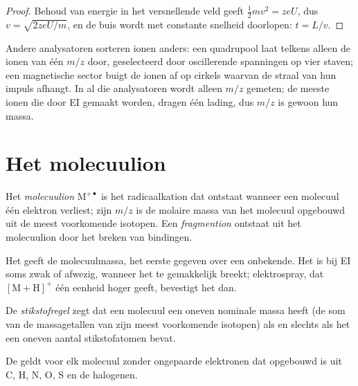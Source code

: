 \begin{proof}
Behoud van energie in het versnellende veld geeft $\tfrac12mv^2 = zeU$, dus $v = \sqrt{2zeU/m}$, en
de buis wordt met constante snelheid doorlopen: $t = L/v$.
\end{proof}

Andere analysatoren sorteren ionen anders: een quadrupool laat telkens alleen de ionen van één $m/z$ door,
geselecteerd door oscillerende spanningen op vier staven; een magnetische sector buigt de ionen af op cirkels waarvan de straal
van hun impuls afhangt. In al die analysatoren wordt alleen $m/z$ gemeten; de meeste ionen die door EI gemaakt worden, dragen één
lading, dus $m/z$ is gewoon hun massa.

\section{Het molecuulion}

\begin{definition}\label{def:b2:mass-spec-atomic:molecular-ion}
Het \emph{molecuulion} $\mathrm M^{+\bullet}$ is het radicaalkation dat ontstaat wanneer een
molecuul één elektron verliest; zijn $m/z$ is de molaire massa van het molecuul opgebouwd uit de meest voorkomende
isotopen. Een \emph{fragmention} ontstaat uit het molecuulion door het breken van
bindingen.
\end{definition}

Het  geeft de molecuulmassa, het eerste gegeven over een onbekende. Het is bij EI soms zwak of
afwezig, wanneer het  te gemakkelijk breekt; elektrospray, dat $[\mathrm M +
\mathrm H]^+$ één eenheid hoger geeft, bevestigt het dan.

\begin{definition}[Stikstofregel]\label{def:b2:mass-spec-atomic:nitrogen-rule}
De \emph{stikstofregel} zegt dat een molecuul een oneven nominale massa heeft (de som
van de massagetallen van zijn meest voorkomende isotopen) als en slechts als het een oneven aantal
stikstofatomen bevat.
\end{definition}

\begin{proposition}\label{prop:b2:mass-spec-atomic:nitrogen-rule}
De  geldt voor elk molecuul zonder ongepaarde elektronen dat opgebouwd is uit C, H, N, O, S en de
halogenen.
\end{proposition}

